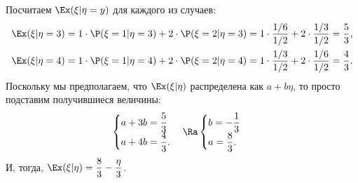 \begin{solution}
    Посчитаем $\Ex(\xi |\eta = y)$ для каждого из случаев:
    \begin{multline*}
        \Ex(\xi|\eta = 3) = 1 \cdot \P(\xi = 1 |\eta = 3) + 2 \cdot \P(\xi = 2 |\eta = 3) = 1 \cdot \dfrac{1/6}{1/2} + 2 \cdot \dfrac{1/3}{1/2} = \dfrac{5}{3}, \\
        \Ex(\xi|\eta = 4) = 1 \cdot \P(\xi = 1 |\eta = 4) + 2 \cdot \P(\xi = 2 |\eta = 4) = 1 \cdot \dfrac{1/3}{1/2} + 2 \cdot \dfrac{1/6}{1/2} = \dfrac{4}{3}.
    \end{multline*}
    Поскольку мы предполагаем, что $\Ex(\xi|\eta)$ распределена как $a + b \eta$, то просто подставим получившиеся величины:
    \[
        \begin{cases}
            a + 3b = \dfrac{5}{3} \\
            a + 4b = \dfrac{4}{3}.
        \end{cases} \Ra
        \begin{cases}
            b = -\dfrac{1}{3} \\
            a = \dfrac{8}{3}.
        \end{cases}
    \]
    И, тогда, $\Ex(\xi |\eta) = \dfrac{8}{3} - \dfrac{\eta}{3}$.
\end{solution}